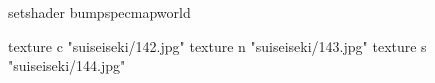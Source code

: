 setshader bumpspecmapworld

    texture c "suiseiseki/142.jpg"
    texture n "suiseiseki/143.jpg"
    texture s "suiseiseki/144.jpg"
